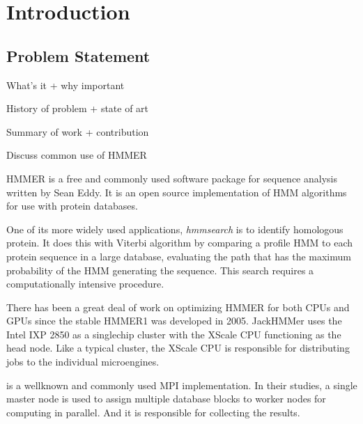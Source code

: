 
\chapter{Introduction} %



\section{Problem Statement}
What's it + why important

History of problem + state of art

Summary of work + contribution

Discuss common use of HMMER

HMMER \citep{HMMER} is a free and commonly used software package for sequence analysis written by Sean Eddy. 
It is an open source implementation of HMM algorithms for use with protein databases.

One of its more widely used applications, \emph{hmmsearch} is to identify homologous protein. It does this with Viterbi algorithm by comparing a profile HMM to each protein sequence in a large database, evaluating the path that has the maximum probability of the HMM generating the sequence.
This search requires a computationally intensive procedure.

There has been a great deal of work on optimizing HMMER for both CPUs and GPUs since the stable HMMER1 was developed in 2005. 
JackHMMer \citep{Wun} uses the Intel IXP 2850 as a singlechip cluster with the XScale CPU functioning as the head node. Like a typical cluster, the XScale CPU is responsible for distributing jobs to the individual microengines. 


\citep{Walters2006} is a wellknown and commonly used MPI implementation. In their studies, a single master node is used to assign multiple database blocks to worker nodes for computing in parallel. And it is responsible for collecting the results.


